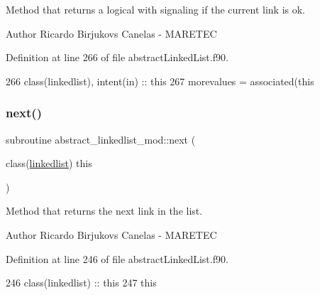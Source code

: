 Method that returns a logical with signaling if the current link is ok. 

\begin{DoxyAuthor}{Author}
Ricardo Birjukovs Canelas -\/ M\+A\+R\+E\+T\+EC 
\end{DoxyAuthor}


Definition at line 266 of file abstract\+Linked\+List.\+f90.


\begin{DoxyCode}
266     \textcolor{keywordtype}{class}(linkedlist), \textcolor{keywordtype}{intent(in)} :: this
267     morevalues = \textcolor{keyword}{associated}(this%
\end{DoxyCode}
\mbox{\label{namespaceabstract__linkedlist__mod_a576f148096561712d6ddd8c848bc7c4b}} 
\subsubsection{\texorpdfstring{next()}{next()}}
{\footnotesize\ttfamily subroutine abstract\+\_\+linkedlist\+\_\+mod\+::next (\begin{DoxyParamCaption}\item[{class(\mbox{\hyperlink{structabstract__linkedlist__mod_1_1linkedlist}{linkedlist}})}]{this }\end{DoxyParamCaption})\hspace{0.3cm}{\ttfamily [private]}}



Method that returns the next link in the list. 

\begin{DoxyAuthor}{Author}
Ricardo Birjukovs Canelas -\/ M\+A\+R\+E\+T\+EC 
\end{DoxyAuthor}


Definition at line 246 of file abstract\+Linked\+List.\+f90.


\begin{DoxyCode}
246     \textcolor{keywordtype}{class}(linkedlist) :: this
247     this%
\end{DoxyCode}
\mbox{\label{namespaceabstract__linkedlist__mod_a0b36d862899c5a40cb98bef4ffd5e2f4}} 
